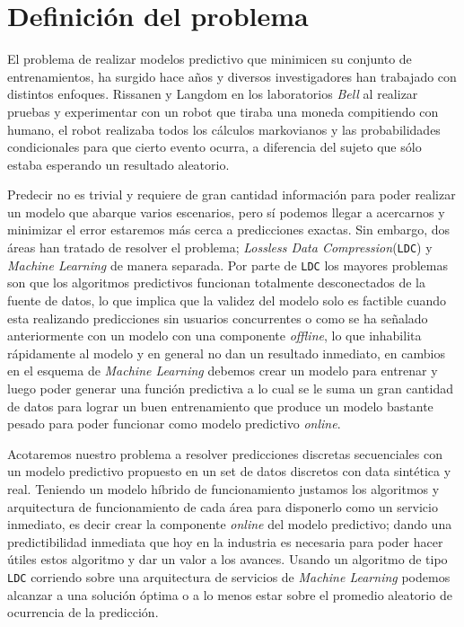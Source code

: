 

\section{Definición del problema}


El problema de realizar modelos predictivo que minimicen su conjunto de entrenamientos, ha surgido hace años y diversos investigadores han trabajado con distintos enfoques. Rissanen\cite{Rissanen1983} y Langdom\cite{Langdon1983} en los laboratorios \emph{Bell} al realizar pruebas y experimentar con un robot que tiraba una moneda compitiendo con humano, el robot realizaba todos los cálculos {markovianos} y las probabilidades condicionales para que cierto evento ocurra, a diferencia del sujeto que sólo estaba esperando un resultado aleatorio.

Predecir no es trivial y requiere de gran cantidad información para poder realizar un modelo que abarque varios escenarios, pero sí podemos llegar a acercarnos y minimizar el error  estaremos más cerca a predicciones exactas. Sin embargo, dos áreas han tratado de resolver el problema;  \emph{Lossless Data Compression}(\texttt{LDC}) y \emph{Machine Learning} de manera separada. Por parte de \texttt{LDC} los mayores problemas son que los algoritmos predictivos  funcionan totalmente desconectados de la fuente de datos, lo que implica que la validez del modelo solo es factible cuando esta realizando predicciones sin usuarios concurrentes o como se ha señalado anteriormente con un modelo con una componente \emph{offline}, lo que inhabilita rápidamente al modelo y en general no dan un resultado inmediato, en cambios en el esquema de \emph{Machine Learning} debemos crear un modelo para entrenar y luego poder generar una función predictiva a lo cual se le suma un gran cantidad de datos para lograr un buen entrenamiento que produce un modelo bastante pesado para poder funcionar como modelo predictivo \emph{online}. 

Acotaremos nuestro problema a resolver predicciones discretas secuenciales con un modelo predictivo propuesto en un set de datos discretos con data sintética y real. Teniendo un modelo híbrido de funcionamiento justamos los algoritmos y arquitectura de funcionamiento de cada área para disponerlo como un servicio inmediato, es decir crear la componente \emph{online} del modelo predictivo; dando una predictibilidad inmediata que hoy en la industria es necesaria para poder hacer útiles estos algoritmo y dar un valor a los avances. Usando un algoritmo de tipo \texttt{LDC} corriendo sobre una arquitectura de  servicios de \emph{Machine Learning} podemos alcanzar a una solución óptima o a lo menos estar sobre el promedio aleatorio de ocurrencia de la predicción.

